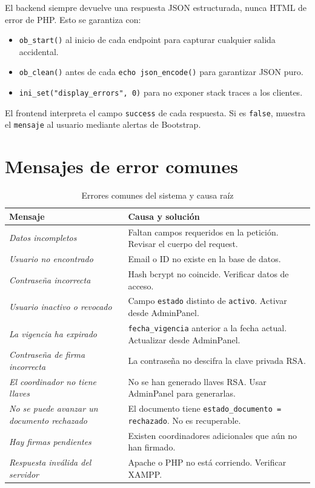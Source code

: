 \documentclass[10pt,letterpaper]{report}
\begin{document}
El backend siempre devuelve una respuesta JSON estructurada, nunca HTML de error de PHP. Esto se garantiza con:

\begin{itemize}
  \item \texttt{ob\_start()} al inicio de cada endpoint para capturar cualquier salida accidental.
  \item \texttt{ob\_clean()} antes de cada \texttt{echo json\_encode()} para garantizar JSON puro.
  \item \texttt{ini\_set("display\_errors", 0)} para no exponer stack traces a los clientes.
\end{itemize}

El frontend interpreta el campo \texttt{success} de cada respuesta. Si es \texttt{false}, muestra el \texttt{mensaje} al usuario mediante alertas de Bootstrap.

\section{Mensajes de error comunes}

\begin{table}[H]
\centering
\caption{Errores comunes del sistema y causa raíz}
\label{tab:errores}
\begin{tabular}{p{} p{}}
\toprule
\textbf{Mensaje} & \textbf{Causa y solución} \\
\midrule
\textit{Datos incompletos} & Faltan campos requeridos en la petición. Revisar el cuerpo del request. \\
\textit{Usuario no encontrado} & Email o ID no existe en la base de datos. \\
\textit{Contraseña incorrecta} & Hash bcrypt no coincide. Verificar datos de acceso. \\
\textit{Usuario inactivo o revocado} & Campo \texttt{estado} distinto de \texttt{activo}. Activar desde AdminPanel. \\
\textit{La vigencia ha expirado} & \texttt{fecha\_vigencia} anterior a la fecha actual. Actualizar desde AdminPanel. \\
\textit{Contraseña de firma incorrecta} & La contraseña no descifra la clave privada RSA. \\
\textit{El coordinador no tiene llaves} & No se han generado llaves RSA. Usar AdminPanel para generarlas. \\
\textit{No se puede avanzar un documento rechazado} & El documento tiene \texttt{estado\_documento = rechazado}. No es recuperable. \\
\textit{Hay firmas pendientes} & Existen coordinadores adicionales que aún no han firmado. \\
\textit{Respuesta inválida del servidor} & Apache o PHP no está corriendo. Verificar XAMPP. \\
\bottomrule
\end{tabular}
\end{table}
\end{document}
